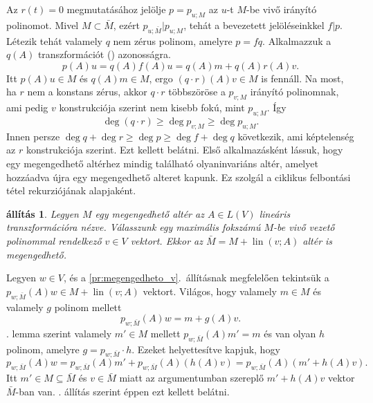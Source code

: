 \documentclass[a4paper, showtrims]{memoir}
\makeatletter
\renewenvironment{proof}[1][\proofname]
    {\par\pushQED{\qed}%
    \normalfont \topsep6\p@\@plus6\p@\relax
    \trivlist
    \item[\hskip\labelsep
        \itshape
    #1\@addpunct{:}]\ignorespaces}
    {\popQED\endtrivlist\@endpefalse}
\theoremstyle{plain}
\newtheorem{proposition}{állítás}[chapter]
\theoremstyle{remark}
\theoremstyle{definition}
\DeclareMathOperator{\lin}{lin}
\makeatother
\begin{document}
\begin{proof}
    Az $r\left( t \right)=0$ megmutatásához jelölje $p=p_{u;M}$ az $u$-t $M$-be vivő irányító polinomot.
    Mivel $M\subset\bar{M}$, ezért $p_{u;\bar{M}}|p_{u;M}$, tehát a bevezetett jelöléseinkkel $f|p$.
    Létezik tehát valamely $q$ nem zérus polinom, amelyre
    \begin{math}
        p=fq.
    \end{math}
    Alkalmazzuk a $q\left( A \right)$ transzformációt (\ddag) azonosságra.
    \[
        p\left( A \right)u
        =
        q\left( A \right)f\left( A \right)u
        =
        q\left( A \right)m+
        q\left( A \right)r\left( A \right)v.
    \]
    Itt $p\left( A \right)u\in M$ és $q\left( A \right)m\in M$, ergo $(q\cdot r)(A)v\in M$ is fennáll.
    Na most, ha $r$ nem a konstans zérus, 
    akkor $q\cdot r$ többszöröse a $p_{v;M}$ irányító polinomnak, ami pedig $v$ konstrukciója szerint 
    nem kisebb fokú, mint $p_{u;M}$.
    Így
    \[
        \deg\left( q\cdot r \right)
        \geq
        \deg p_{v;M}
        \geq
        \deg p_{u;M}.
    \]
    Innen persze 
    $
    \deg q+\deg r
    \geq \deg p
    \geq 
    \deg f+\deg q
    $ következik, ami képtelenség az $r$ konstrukciója szerint.
    Ezt kellett belátni. 
\end{proof}
Első alkalmazásként lássuk, 
hogy egy megengedhető altérhez mindig található olyaninvariáns altér,
amelyet hozzáadva újra egy megengedhető alteret kapunk.
Ez szolgál a ciklikus felbontási tétel rekurziójának alapjaként.
\begin{proposition}
    Legyen $M$ egy megengedhető altér az $A\in L\left( V \right)$ lineáris transzformációra nézve.
    Válasszunk egy maximális fokszámú $M$-be vivő vezető polinommal rendelkező $v\in V$ vektort.
    Ekkor az $\bar{M}=M+\lin\left( v;A \right)$ altér is megengedhető.
\end{proposition}
\begin{proof}
    Legyen $w\in V$, és a \ref{pr:megengedheto_v}.~állításnak megfelelően 
    tekintsük a $p_{w;\bar{M}}\left( A \right)w\in M+\lin\left( v;A \right)$ vektort.
    Világos, hogy valamely $m\in M$ és valamely $g$ polinom mellett
    \[
        p_{w;\bar{M}}\left( A \right)w
        =
        m+g\left( A \right)v.
    \]
    . lemma szerint valamely $m'\in M$ mellett $p_{w;\bar{M}}\left( A \right)m'=m$ és
    van olyan $h$ polinom, amelyre $g=p_{w;\bar{M}}\cdot h$.
    Ezeket helyettesítve kapjuk, hogy 
    \[
        p_{w;\bar{M}}\left( A \right)w
        =
        p_{w;\bar{M}}\left( A \right)m'+p_{w;\bar{M}}\left( A \right)\left( h\left( A \right)v\right)
        =
        p_{w;\bar{M}}\left( A \right)\left(m'+h\left( A \right)v \right).
    \]
    Itt $m'\in M\subseteq\bar{M}$ és $v\in \bar{M}$ miatt az argumentumban szereplő
    \begin{math}
         m'+h\left( A \right)v
    \end{math}
    vektor $\bar{M}$-ban van. 
    . állítás szerint éppen ezt kellett belátni.
\end{proof}
\end{document}
